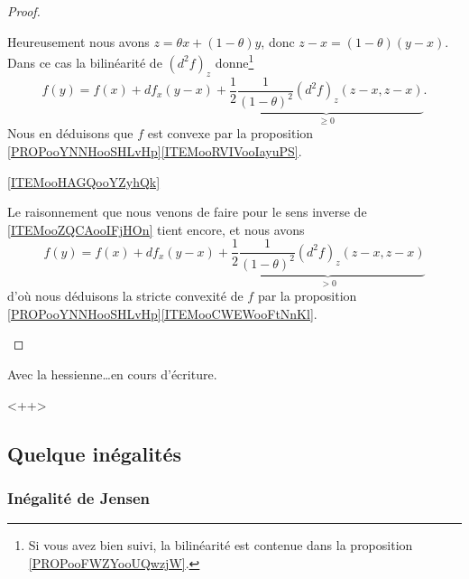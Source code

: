 \begin{proof}
\begin{subproof}
        Heureusement nous avons \( z=\theta x+(1-\theta)y\), donc \( z-x=(1-\theta)(y-x)\). Dans ce cas la bilinéarité de \( (d^2f)_z\) donne\footnote{Si vous avez bien suivi, la bilinéarité est contenue dans la proposition \ref{PROPooFWZYooUQwzjW}.}
        \begin{equation}
            f(y)=f(x)+df_x(y-x)+\underbrace{\frac{ 1 }{2}\frac{1}{ (1-\theta)^2 }(d^2f)_z(z-x,z-x)}_{\geq 0}.
        \end{equation}
        Nous en déduisons que \( f\) est convexe par la proposition \ref{PROPooYNNHooSHLvHp}\ref{ITEMooRVIVooIayuPS}.
    \item[\ref{ITEMooHAGQooYZyhQk}]

        Le raisonnement que nous venons de faire pour le sens inverse de \ref{ITEMooZQCAooIFjHOn} tient encore, et nous avons
        \begin{equation}
            f(y)=f(x)+df_x(y-x)+\underbrace{\frac{ 1 }{2}\frac{1}{ (1-\theta)^2 }(d^2f)_z(z-x,z-x)}_{> 0}
        \end{equation}
        d'où nous déduisons la stricte convexité de \( f\) par la proposition \ref{PROPooYNNHooSHLvHp}\ref{ITEMooCWEWooFtNnKl}.
    \end{subproof}
\end{proof}

\begin{corollary}       \label{CORooMBQMooWBAIIH}
    Avec la hessienne\ldots en cours d'écriture.
\end{corollary}
<++>

\subsection{Quelque inégalités}

\subsubsection{Inégalité de Jensen}

